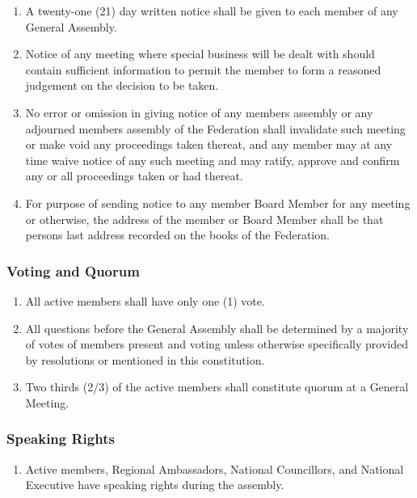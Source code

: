 \begin{enumerate}
 \item
  A twenty-one (21) day written notice shall be given to each member of any General Assembly.
 \item
  Notice of any meeting where special business will be dealt with should contain sufficient information to permit the member to form a reasoned judgement on the decision to be taken.
 \item
  No error or omission in giving notice of any members assembly or any adjourned members assembly of the Federation shall invalidate such meeting or make void any proceedings taken thereat, and any member may at any time waive notice of any such meeting and may ratify, approve and confirm any or all proceedings taken or had thereat.
 \item
  For purpose of sending notice to any member Board Member for any meeting or otherwise, the address of the member or Board Member shall be that persons last address recorded on the books of the Federation.
\end{enumerate}

\subsubsection{Voting and Quorum}
\label{voting-and-quorum}

\begin{enumerate}
 \item
  All active members shall have only one (1) vote.
 \item
  All questions before the General Assembly shall be determined by a majority of votes of members present and voting unless otherwise specifically provided by resolutions or mentioned in this constitution.
 \item
  Two thirds (2/3) of the active members shall constitute quorum at a General Meeting.
\end{enumerate}

\subsubsection{Speaking Rights}
\label{speaking-rights}

\begin{enumerate}
 \item
  Active members, Regional Ambassadors, National Councillors, and National Executive have speaking rights during the assembly.
\end{enumerate}

